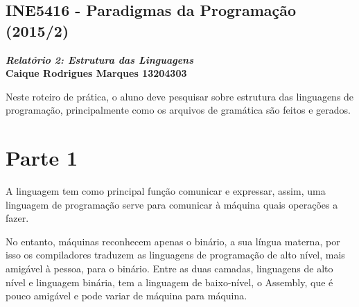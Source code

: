 \documentclass{article}
\begin{document}
\lstset{language=C}
\begin{center}
    \section*{INE5416 - Paradigmas da Programação (2015/2)}
    \textbf{\textit{Relatório 2: Estrutura das Linguagens} \\
    Caique Rodrigues Marques 13204303}
\end{center}
    Neste roteiro de prática, o aluno deve pesquisar sobre estrutura das
    linguagens de programação, principalmente como os arquivos de gramática são
    feitos e gerados.
\section*{Parte 1}
    A linguagem tem como principal função comunicar e expressar, assim, uma
    linguagem de programação serve para comunicar à máquina quais operações a
    fazer.

    No entanto, máquinas reconhecem apenas o binário, a sua língua materna, por
    isso os compiladores traduzem as linguagens de programação de alto nível,
    mais amigável à pessoa, para o binário. Entre as duas camadas, linguagens
    de alto nível e linguagem binária, tem a linguagem de baixo-nível, o
    Assembly, que é pouco amigável e pode variar de máquina para máquina.
\end{document}
